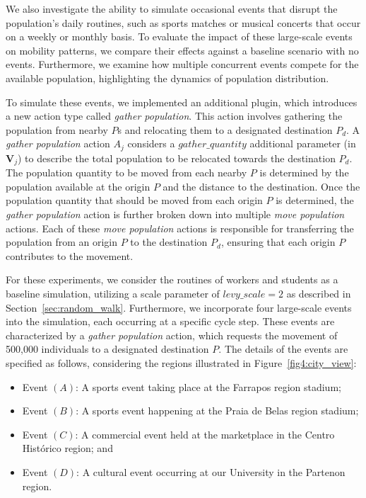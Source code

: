 \documentclass[pdflatex,sn-mathphys-num]{sn-jnl}%
\theoremstyle{thmstyleone}%
\theoremstyle{thmstyletwo}%
\theoremstyle{thmstylethree}%
\begin{document}
We also investigate the ability to simulate occasional events that disrupt the population's daily routines, such as sports matches or musical concerts that occur on a weekly or monthly basis.
To evaluate the impact of these large-scale events on mobility patterns, we compare their effects against a baseline scenario with no events. Furthermore, we examine how multiple concurrent events compete for the available population, highlighting the dynamics of population distribution.

To simulate these events, we implemented an additional plugin, which introduces a new action type called \textit{gather population}. This action involves gathering the population from nearby $P$s and relocating them to a designated destination $P_d$. 
A \textit{gather population} action $A_j$ considers a $gather\_quantity$ additional parameter (in $\bm{V}_{j}$)  to describe the total population to be relocated towards the destination $P_d$. 
The population quantity to be moved from each nearby $P$ is determined by the population available at the origin $P$ and the distance to the destination.
Once the population quantity that should be moved from each origin $P$ is determined, the \textit{gather population} action is further broken down into multiple \textit{move population} actions. Each of these \textit{move population} actions is responsible for transferring the population from an origin $P$ to the destination $P_d$, ensuring that each origin $P$ contributes to the movement.

For these experiments, we consider the routines of workers and students as a baseline simulation, utilizing a scale parameter of $levy\_scale = 2$ as described in Section~\ref{sec:random_walk}.
Furthermore, we incorporate four large-scale events into the simulation, each occurring at a specific cycle step. These events are characterized by a \textit{gather population} action, which requests the movement of 500,000 individuals to a designated destination $P$. The details of the events are specified as follows, considering the regions illustrated in Figure~\ref{fig4:city_view}: 

\begin{itemize}
    \item Event $(A)$: A sports event taking place at the Farrapos region stadium;
    \item Event $(B)$: A sports event happening at the Praia de Belas region stadium;
    \item Event $(C)$: A commercial event held at the marketplace in the Centro Histórico region; and
    \item Event $(D)$: A cultural event occurring at our University in the Partenon region.
\end{itemize}
\end{document}
